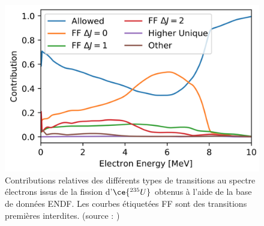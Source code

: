 {%
\begin{figure}[h!]
  \centering
  \includegraphics[width=0.7\linewidth]{images/FF_decays_dominating_5MeV.png}
  \caption[Contributions relatives des différents types de transitions au spectre électrons issus de la fission d'$\ce{^{235}U}$ obtenus à l'aide de la base de données ENDF]{Contributions relatives des différents types de transitions au spectre électrons issus de la fission d'$\ce{^{235}U}$ obtenus à l'aide de la base de données ENDF. Les courbes étiquetées FF sont des transitions premières interdites. (source : \cite{Hayen:2018uyg})}
  \label{fig:FF_decays_dominating_5MeV.png}
\end{figure}


\clearpage

}
